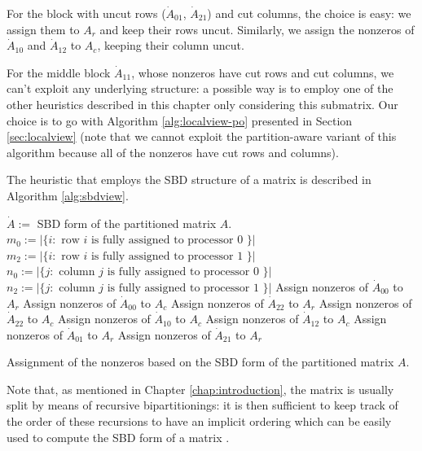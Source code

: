 For the block with uncut rows ($\dot{A}_{01}$, $\dot{A}_{21}$) and cut columns, the choice is easy: we assign them to $A_r$ and keep their rows uncut. Similarly, we assign the nonzeros of $\dot{A}_{10}$ and $\dot{A}_{12}$ to $A_c$, keeping their column uncut. 

For the middle block $\dot{A}_{11}$, whose nonzeros have cut rows and cut columns, we can't exploit any underlying structure: a possible way is to employ one of the other heuristics described in this chapter only considering this submatrix. Our choice is to go with Algorithm \ref{alg:localview-po} presented in Section \ref{sec:localview} (note that we cannot exploit the partition-aware variant of this algorithm because all of the nonzeros have cut rows and columns).

The heuristic that employs the SBD structure of a matrix is described in Algorithm \ref{alg:sbdview}.

\begin{algorithm}[h]
	\begin{algorithmic}
		\State
		\State $\dot{A}:=$ SBD form of the partitioned matrix $A$.
		\State $m_0 := |\{ i : \text{ row } i \text{ is fully assigned to processor 0 } \}|$
		\State $m_2 := |\{ i : \text{ row } i \text{ is fully assigned to processor 1 } \}|$
		\State $n_0 := |\{ j : \text{ column } j \text{ is fully assigned to processor 0 } \}|$
		\State $n_2 := |\{ j : \text{ column } j \text{ is fully assigned to processor 1 } \}|$
		\State
		\State Assign nonzeros of $\dot{A}_{00}$ to $A_r$
		\Else
		\State Assign nonzeros of $\dot{A}_{00}$ to $A_c$
		\EndIf
		\State Assign nonzeros of $\dot{A}_{22}$ to $A_r$
		\Else
		\State Assign nonzeros of $\dot{A}_{22}$ to $A_c$
		\EndIf
		\State
		\State Assign nonzeros of $\dot{A}_{10}$ to $A_c$
		\State Assign nonzeros of $\dot{A}_{12}$ to $A_c$
		\State Assign nonzeros of $\dot{A}_{01}$ to $A_r$
		\State Assign nonzeros of $\dot{A}_{21}$ to $A_r$
	\end{algorithmic}
	\caption{Assignment of the nonzeros based on the SBD form of the partitioned matrix $A$.} \label{alg:sbdview}
\end{algorithm}

Note that, as mentioned in Chapter \ref{chap:introduction}, the matrix is usually split by means of recursive bipartitionings: it is then sufficient to keep track of the order of these recursions to have an implicit ordering which can be easily used to compute the SBD form of a matrix \cite{yzelman_cache}.


